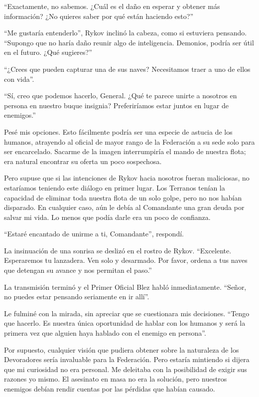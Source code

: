 \documentclass[spanish,12pt,a4paper,oneside,titlepage]{book}
\begin{document}
    “Exactamente, no sabemos. ¿Cuál es el daño en esperar y obtener más información? ¿No quieres saber por qué están haciendo esto?”

    “Me gustaría entenderlo”, Rykov inclinó la cabeza, como si estuviera pensando. “Supongo que no haría daño reunir algo de inteligencia. Demonios, podría ser útil en el futuro. ¿Qué sugieres?”

    “¿Crees que pueden capturar una de sus naves? Necesitamos traer a uno de ellos con vida”.

    ``Sí, creo que podemos hacerlo, General. ¿Qué te parece unirte a nosotros en persona en nuestro buque insignia? Preferiríamos estar juntos en lugar de enemigos.''

    Pesé mis opciones. Esto fácilmente podría ser una especie de astucia de los humanos, atrayendo al oficial de mayor rango de la Federación a su sede solo para ser encarcelado. Sacarme de la imagen interrumpiría el mando de nuestra flota; era natural encontrar su oferta un poco sospechosa.

    Pero supuse que si las intenciones de Rykov hacia nosotros fueran maliciosas, no estaríamos teniendo este diálogo en primer lugar. Los Terranos tenían la capacidad de eliminar toda nuestra flota de un solo golpe, pero no nos habían disparado. En cualquier caso, aún le debía al Comandante una gran deuda por salvar mi vida. Lo menos que podía darle era un poco de confianza.

    “Estaré encantado de unirme a ti, Comandante”, respondí.

    La insinuación de una sonrisa se deslizó en el rostro de Rykov. “Excelente. Esperaremos tu lanzadera. Ven solo y desarmado. Por favor, ordena a tus naves que detengan su avance y nos permitan el paso.”

    La transmisión terminó y el Primer Oficial Blez habló inmediatamente. “Señor, no puedes estar pensando seriamente en ir allí”.

    Le fulminé con la mirada, sin apreciar que se cuestionara mis decisiones. “Tengo que hacerlo. Es nuestra única oportunidad de hablar con los humanos y será la primera vez que alguien haya hablado con el enemigo en persona”.

    Por supuesto, cualquier visión que pudiera obtener sobre la naturaleza de los Devoradores sería invaluable para la Federación. Pero estaría mintiendo si dijera que mi curiosidad no era personal. Me deleitaba con la posibilidad de exigir sus razones yo mismo. El asesinato en masa no era la solución, pero nuestros enemigos debían rendir cuentas por las pérdidas que habían causado.
\end{document}
